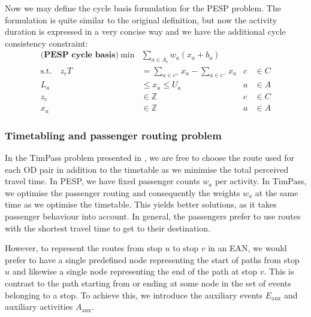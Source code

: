 \documentclass[english, 12pt, a4paper, sci, utf8, a-2b, online]{aaltothesis}
\newcommand{\Z}{\mathbb{Z}}
\newcommand{\Eaux}{E_\text{aux}}
\newcommand{\Aaux}{A_\text{aux}}
\newcommand{\Ar}{A_\text{r}}
\begin{document}


Now we may define the cycle basis formulation for the PESP problem. The formulation is quite similar to the original definition, but now the activity duration is expressed in a very concise way and we have the additional cycle consistency constraint:
\begin{align}
    \textbf{(PESP cycle basis)}\ \min &  \sum_{a \in \Ar} w_{a} (x_a + b_a) \\
    \textrm{s.t.} \quad  z_c T &= \sum_{a\in c^+} x_a - \sum_{a\in c^-} x_a &c &\in C \\
    L_a &\leq x_a  \leq U_a &a &\in A \\
    z_c &\in \Z &c& \in C \\
    x_a &\in \Z &a& \in A
\end{align}


\subsubsection{Timetabling and passenger routing problem}


In the TimPass problem presented in \cite{timpass-original-2014}, we are free to choose the route used for each OD pair in addition to the timetable as we minimise the total perceived travel time. In PESP, we have fixed passenger counts $w_a$ per activity. In TimPass, we optimise the passenger routing and consequently the weights $w_a$ at the same time as we optimise the timetable. This yields better solutions, as it takes passenger behaviour into account. In general, the passengers prefer to use routes with the shortest travel time to get to their destination.




However, to represent the routes from stop $u$ to stop $v$ in an EAN, we would prefer to have a single predefined node representing the start of paths from stop $u$ and likewise a single node representing the end of the path at stop $v$. This is contrast to the path starting from or ending at some node in the set of events belonging to a stop. To achieve this, we introduce the auxiliary events $\Eaux$ and auxiliary activities $\Aaux$. 
\end{document}
